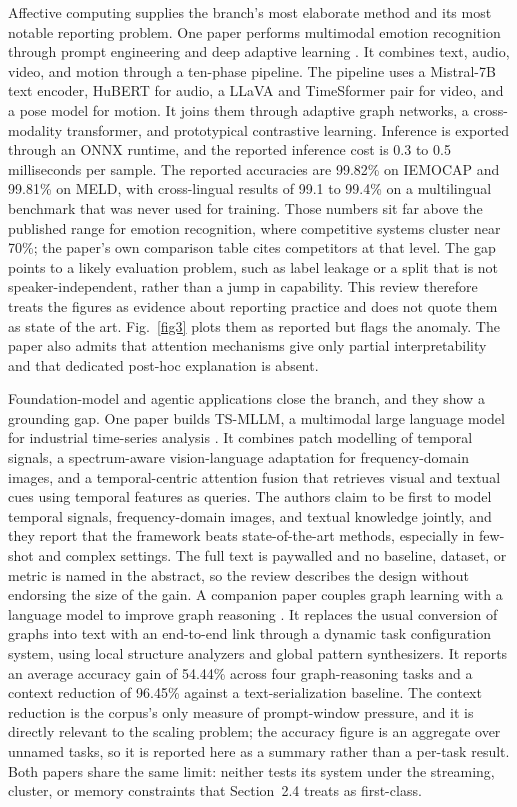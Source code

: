 \documentclass[pdflatex,sn-basic,Numbered]{sn-jnl}%
\begin{document}
Affective computing supplies the branch's most elaborate method and its most notable reporting problem. One paper performs multimodal emotion recognition through prompt engineering and deep adaptive learning \citep{wafa2025advancing}. It combines text, audio, video, and motion through a ten-phase pipeline. The pipeline uses a Mistral-7B text encoder, HuBERT for audio, a LLaVA and TimeSformer pair for video, and a pose model for motion. It joins them through adaptive graph networks, a cross-modality transformer, and prototypical contrastive learning. Inference is exported through an ONNX runtime, and the reported inference cost is 0.3 to 0.5 milliseconds per sample. The reported accuracies are 99.82\% on IEMOCAP and 99.81\% on MELD, with cross-lingual results of 99.1 to 99.4\% on a multilingual benchmark that was never used for training. Those numbers sit far above the published range for emotion recognition, where competitive systems cluster near 70\%; the paper's own comparison table cites competitors at that level. The gap points to a likely evaluation problem, such as label leakage or a split that is not speaker-independent, rather than a jump in capability. This review therefore treats the figures as evidence about reporting practice and does not quote them as state of the art. Fig.~\ref{fig3} plots them as reported but flags the anomaly. The paper also admits that attention mechanisms give only partial interpretability and that dedicated post-hoc explanation is absent.

Foundation-model and agentic applications close the branch, and they show a grounding gap. One paper builds TS-MLLM, a multimodal large language model for industrial time-series analysis \citep{wang2026mllm}. It combines patch modelling of temporal signals, a spectrum-aware vision-language adaptation for frequency-domain images, and a temporal-centric attention fusion that retrieves visual and textual cues using temporal features as queries. The authors claim to be first to model temporal signals, frequency-domain images, and textual knowledge jointly, and they report that the framework beats state-of-the-art methods, especially in few-shot and complex settings. The full text is paywalled and no baseline, dataset, or metric is named in the abstract, so the review describes the design without endorsing the size of the gain. A companion paper couples graph learning with a language model to improve graph reasoning \citep{chai2025graphllm}. It replaces the usual conversion of graphs into text with an end-to-end link through a dynamic task configuration system, using local structure analyzers and global pattern synthesizers. It reports an average accuracy gain of 54.44\% across four graph-reasoning tasks and a context reduction of 96.45\% against a text-serialization baseline. The context reduction is the corpus's only measure of prompt-window pressure, and it is directly relevant to the scaling problem; the accuracy figure is an aggregate over unnamed tasks, so it is reported here as a summary rather than a per-task result. Both papers share the same limit: neither tests its system under the streaming, cluster, or memory constraints that Section~2.4 treats as first-class.
\end{document}
